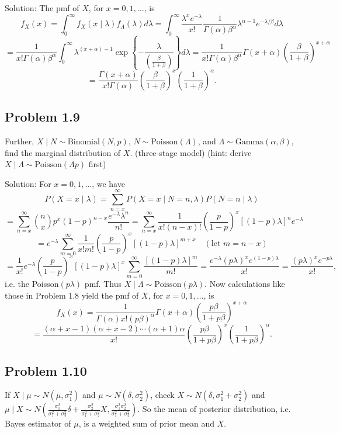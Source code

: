 {Solution:}
The pmf of $X$, for $x=0,1,\ldots$, is
\[
f_{X}(x)=\int_{0}^{\infty}f_{X}(x\mid\lambda)f_{\Lambda}(\lambda)d\lambda=\int_{0}^{\infty}\frac{\lambda^{x}e^{-\lambda}}{x!}\frac{1}{\Gamma(\alpha)\beta^{\alpha}}\lambda^{\alpha-1}e^{-\lambda/\beta}d\lambda
\]
\[
=\frac{1}{x!\Gamma(\alpha)\beta^{\alpha}}\int_{0}^{\infty}\lambda^{(x+\alpha)-1}\exp\left\{-\frac{\lambda}{\left(\frac{\beta}{1+\beta}\right)}\right\}d\lambda
=\frac{1}{x!\Gamma(\alpha)\beta^{\alpha}}\Gamma(x+\alpha)\left(\frac{\beta}{1+\beta}\right)^{x+\alpha}
\]
\[
=\frac{\Gamma(x+\alpha)}{x!\Gamma(\alpha)}\left(\frac{\beta}{1+\beta}\right)^{x}\left(\frac{1}{1+\beta}\right)^{\alpha}.
\]

\subsection*{Problem 1.9}
Further, $X\mid N\sim\text{Binomial}(N,p)$, $N\sim\text{Poisson}(\Lambda)$, and $\Lambda\sim\text{Gamma}(\alpha,\beta)$, find the marginal distribution of $X$. (three-stage model) (hint: derive $X\mid\Lambda\sim\text{Poisson}(\Lambda p)$ first)

{Solution:}
For $x=0,1,\ldots$, we have
\[
P(X=x\mid\lambda)=\sum_{n=x}^{\infty}P(X=x\mid N=n,\lambda)P(N=n\mid\lambda)
\]
\[
=\sum_{n=x}^{\infty}\binom{n}{x} p^{x}(1-p)^{n-x}\frac{e^{-\lambda}\lambda^{n}}{n!}
=\sum_{n=x}^{\infty}\frac{1}{x!(n-x)!}\left(\frac{p}{1-p}\right)^{x}\left[(1-p)\lambda\right]^{n}e^{-\lambda}
\]
\[
=e^{-\lambda}\sum_{m=0}^{\infty}\frac{1}{x!m!}\left(\frac{p}{1-p}\right)^{x}\left[(1-p)\lambda\right]^{m+x}\quad(\text{let }m=n-x)
\]
\[
=\frac{1}{x!}e^{-\lambda}\left(\frac{p}{1-p}\right)^{x}\left[(1-p)\lambda\right]^{x}\sum_{m=0}^{\infty}\frac{\left[(1-p)\lambda\right]^{m}}{m!}
=\frac{e^{-\lambda}(p\lambda)^{x}e^{(1-p)\lambda}}{x!}=\frac{(p\lambda)^{x}e^{-p\lambda}}{x!},
\]
i.e. the Poisson$(p\lambda)$ pmf. Thus $X\mid\Lambda\sim\text{Poisson}(p\lambda)$. Now calculations like those in Problem 1.8 yield the pmf of $X$, for $x=0,1,\ldots$, is
\[
f_{X}(x)=\frac{1}{\Gamma(\alpha)x!(p\beta)^{\alpha}}\Gamma(x+\alpha)\left(\frac{p\beta}{1+p\beta}\right)^{x+\alpha}
\]
\[
=\frac{(\alpha+x-1)(\alpha+x-2)\cdots(\alpha+1)\alpha}{x!}\left(\frac{p\beta}{1+p\beta}\right)^{x}\left(\frac{1}{1+p\beta}\right)^{\alpha}.
\]

\subsection*{Problem 1.10}
If $X\mid\mu\sim N\left(\mu,\sigma_{1}^{2}\right)$ and $\mu\sim N\left(\delta,\sigma_{2}^{2}\right)$, check $X\sim N\left(\delta,\sigma_{1}^{2}+\sigma_{2}^{2}\right)$ and $\mu\mid X\sim N\left(\frac{\sigma_{1}^{2}}{\sigma_{1}^{2}+\sigma_{2}^{2}}\delta+\frac{\sigma_{2}^{2}}{\sigma_{1}^{2}+\sigma_{2}^{2}}X,\frac{\sigma_{1}^{2}\sigma_{2}^{2}}{\sigma_{1}^{2}+\sigma_{2}^{2}}\right)$. So the mean of posterior distribution, i.e. Bayes estimator of $\mu$, is a weighted sum of prior mean and $X$.

